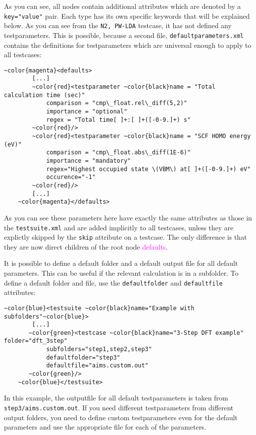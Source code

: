 \documentclass[a4paper,12pt]{scrartcl}
\begin{document}
As you can see, all nodes contain additional attributes which are denoted by a \texttt{key="value"} pair. Each type
has its own specific keywords that will be explained below. As you can see from the \texttt{N2, PW-LDA} testcase, it
has not defined any testparameters. This is possible, because a second file, \texttt{defaultparameters.xml} contains
the definitions for testparameters which are universal enough to apply to all testcases:
\begin{Verbatim}[commandchars=~\{\},gobble=4, frame=single, framesep=2mm, label=excerpt from defaultparameters.xml,
labelposition=bottomline]
    ~color{magenta}<defaults>
        [...]
        ~color{red}<testparameter ~color{black}name = "Total calculation time (sec)"
            comparison = "cmp\_float.rel\_diff(5,2)"
            importance = "optional"
            regex = "Total time[ ]+:[ ]+([-0-9.]+) s"
        ~color{red}/>
        ~color{red}<testparameter ~color{black}name = "SCF HOMO energy (eV)"
            comparison = "cmp\_float.abs\_diff(1E-6)"
            importance = "mandatory"
            regex="Highest occupied state \(VBM\) at[ ]+([-0-9.]+) eV"
            occurence="-1"
        ~color{red}/>
        [...]
    ~color{magenta}</defaults>
\end{Verbatim}
As you can see these parameters here have exactly the same attributes as those in the \texttt{testsuite.xml} and are
added implicitly to all testcases, unless they are explictly skipped by the \texttt{skip} attribute on a testcase.
The only difference is that they are now direct children of the root node \textcolor{magenta}{defaults}. 

It is possible to define a default folder and a default output file for all default parameters. This can be useful if the relevant calculation is in a subfolder. To define a default folder and file, use the \texttt{defaultfolder} and \texttt{defaultfile} attributes:
\begin{Verbatim}[commandchars=~\{\},gobble=4, frame=single, framesep=2mm, label=example for default output folder,
labelposition=bottomline]
    ~color{blue}<testsuite ~color{black}name="Example with subfolders"~color{blue}>
        [...]
       ~color{green}<testcase ~color{black}name="3-Step DFT example" folder="dft_3step" 
            subfolders="step1,step2,step3" 
            defaultfolder="step3" 
            defaultfile="aims.custom.out"
       ~color{green}/> 
    ~color{blue}</testsuite>
\end{Verbatim}
In this example, the outputfile for all default testparameters is taken from \\
\texttt{step3/aims.custom.out}. If you need different testparameters from different output folders, you need to define custom testparameters even for the default parameters and use the appropriate file for each of the parameters.
\end{document}
